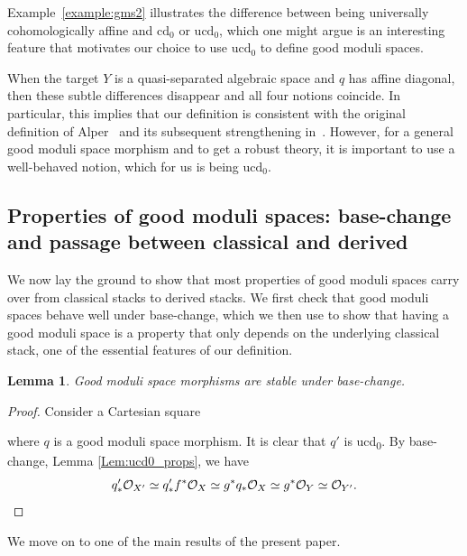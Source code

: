 \documentclass[a4paper,twoside,11pt]{amsart}
\theoremstyle{plain}
\newtheorem{lemma}[theorem]{Lemma}
\theoremstyle{definition}
\theoremstyle{remark}
\numberwithin{equation}{section}
\newcommand{\cd}{\mathrm{cd}}
\newcommand{\ucd}{$\mathrm{ucd}_{0}$\xspace}
\renewcommand{\cd}{$\mathrm{cd}_{0}$\xspace}
\newcommand{\oO}{\mathcal{O}}
\begin{document}
Example~\ref{example:gms2} illustrates the difference between being universally cohomologically affine and \cd or \ucd, which one might argue is an interesting feature that motivates our choice to use \ucd to define good moduli spaces.
\smallskip

When the target $Y$ is a quasi-separated algebraic space and $q$ has affine diagonal, then these subtle differences disappear and all four notions coincide. In particular, this implies that our definition is consistent with the original definition of Alper~\cite{AlperGood} and its subsequent strengthening in~\cite{AHR2,AlperLuna,FerrandPush}. However, for a general good moduli space morphism and to get a robust theory, it is important to use a well-behaved notion, which for us is being \ucd.



\subsection{Properties of good moduli spaces: base-change and passage between classical and derived} We now lay the ground to show that most properties of good moduli spaces carry over from classical stacks to derived stacks. We first check that good moduli spaces behave well under base-change, which we then use to show that having a good moduli space is a property that only depends on the  underlying classical stack, one of the essential features of our definition.

\begin{lemma}
\label{Lem:GMS_base-change}
    Good moduli space morphisms are stable under base-change.
\end{lemma}

\begin{proof}
    Consider a Cartesian square
    \begin{center}
    \end{center}
    where $q$ is a good moduli space morphism. It is clear that $q'$ is ucd\textsubscript{0}. By base-change, Lemma \ref{Lem:ucd0_props}, we have
    \[ q'_*\oO_{X'} \simeq q'_*f^*\oO_X \simeq g^*q_*\oO_X \simeq g^*\oO_Y \simeq \oO_{Y'}. \qedhere \] 
\end{proof}

We move on to one of the main results of the present paper.
\end{document}
